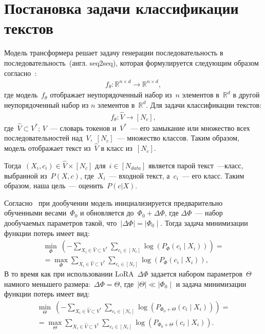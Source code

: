 \newpage


\section{Постановка задачи классификации текстов}
Модель трансформера решает задачу генерации последовательность в последовательность~(англ. seq2seq), которая формулируется следующим образом согласно~\cite{thickstun2021transformer}: 
\begin{align}
f_\theta: \mathbb{R}^{n \times d} \rightarrow \mathbb{R}^{n \times d},   
\end{align}
где модель~$f_{\theta}$ отображает неупорядоченный набор из~$n$ элементов в~$\mathbb{R}^{d}$ в другой неупорядоченный набор из $n$ элементов в~$\mathbb{R}^{d}$. Для задачи классификации текстов:
\begin{align}
f_\theta : \hat{V} \rightarrow [N_c],
\end{align}
где~$\hat{V} \subset V^{*}$; $V$~--- словарь токенов и~$V^{*}$~--- его замыкание или множество всех последовательностей над~$V$,~$[N_c]$~--- множество классов. Таким образом, модель отображает текст из~$\hat{V}$ в класс из~$[N_c]$.

Тогда~$(X_i, c_i) \in \hat{V} \times [N_c]$ для~$i \in [N_{data}]$ является парой текст~---класс, выбранной из~$P(X, c)$, где~$X_i$~--- входной текст, а~$c_i$~--- его класс. Таким образом, наша цель~--- оценить~$P(c|X)$.

Согласно~\cite{hu2021lora} при дообучении модель инициализируется предварительно обученными весами~$\Phi_0$ и обновляется до~$\Phi_0 + \Delta\Phi$, где $\Delta\Phi$~--- набор дообучаемых параметров такой, что~$\mid\Delta\Phi\mid = \mid\Phi_0\mid$. Тогда задача минимизации функции потерь имеет вид:
\begin{equation}
\label{eq:12} 
\begin{aligned}
\min _{\Phi}~(-\sum_{X_i \in \hat{V} \subset V^{*}} \sum_{c_i \in [N_c]} \log \left(P_{\Phi}\left(c_i \mid X_i\right)\right)) =\\ 
= \max _{\Phi} \sum_{X_i \in \hat{V} \subset V^{*}} \sum_{c_i \in [N_c]} \log \left(P_{\Phi}\left(c_i \mid X_i\right)\right),
\end{aligned}
\end{equation}
В то время как при использовании LoRA~$\Delta\Phi$ задается набором параметров~$\Theta$ намного меньшего размера:~$\Delta\Phi = \Theta$, где~$\mid\Theta\mid \ll \mid\Phi_0\mid$ и задача минимизации функции потерь имеет вид:
\begin{equation}
\label{eq:13}
\begin{aligned}
\min _{\Theta}~(-\sum_{X_i \in \hat{V} \subset V^{*}} \sum_{c_i \in [N_c]} \log \left(P_{\Phi_0+\Theta}\left(c_i \mid X_i\right)\right)) =\\
= \max _{\Theta} \sum_{X_i \in \hat{V} \subset V^{*}} \sum_{c_i \in [N_c]} \log \left(P_{\Phi_0+\Theta}\left(c_i \mid X_i\right)\right). 
\end{aligned}
\end{equation}


